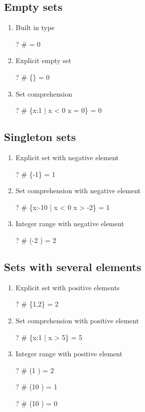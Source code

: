 \documentclass{article}
\newcommand{\negate}{-}
\begin{document}
\subsection{Empty sets}
\begin{enumerate}
\item Built in type
\begin{zed} \vdash?  \# \emptyset = 0 \end{zed}
\item Explicit empty set
\begin{zed} \vdash?  \# \{\} = 0 \end{zed}
\item Set comprehension
\begin{zed} \vdash?  \# \{x:1  | x < 0 \land x = 0\} = 0 \end{zed}
\end{enumerate}

\subsection{Singleton sets}
\begin{enumerate}
\item Explicit set with negative element
\begin{zed} \vdash?  \# \{\negate 1\} = 1 \end{zed}
\item Set comprehension with negative element
\begin{zed} \vdash?  \# \{x:\negate 10 \upto \negate 1 | x < 0 \land x > \negate 2\} = 1 \end{zed}
\item Integer range with negative element
\begin{zed} \vdash?  \# (\negate 2 \upto \negate 1) = 2 \end{zed}
\end{enumerate}

\subsection{Sets with several elements}
\begin{enumerate}
\item Explicit set with positive elements
\begin{zed} \vdash?  \# \{1,2\} = 2 \end{zed}
\item Set comprehension with positive element
\begin{zed} \vdash?  \# \{x:1  | x > 5\} = 5 \end{zed}
\item Integer range with positive element
\begin{zed} \vdash?  \# (1 ) = 2 \end{zed}
\begin{zed} \vdash?  \# (10 ) = 1 \end{zed}
\begin{zed} \vdash?  \# (10 ) = 0 \end{zed}
\end{enumerate}
\end{document}
